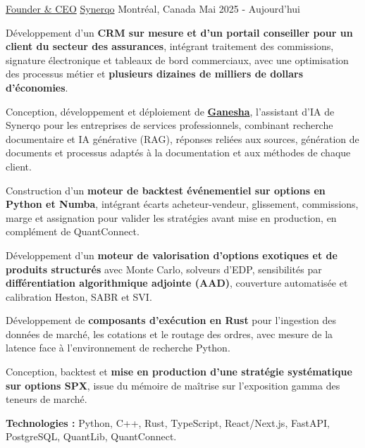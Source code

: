 \begin{cventries}

  \cventry
    {\href{https://synerqo.com/fr}{Founder \& CEO}}
    {\href{https://synerqo.com/fr}{Synerqo}}
    {Montréal, Canada}
    {Mai 2025 - Aujourd'hui}
    {
      \begin{cvitems}
        \item{Développement d'un \textbf{CRM sur mesure et d'un portail conseiller pour un client du secteur des assurances}, intégrant traitement des commissions, signature électronique et tableaux de bord commerciaux, avec une optimisation des processus métier et \textbf{plusieurs dizaines de milliers de dollars d'économies}.}
        \item{Conception, développement et déploiement de \textbf{\href{https://ganesha.synerqo.com/fr}{Ganesha}}, l'assistant d'IA de Synerqo pour les entreprises de services professionnels, combinant recherche documentaire et IA générative (RAG), réponses reliées aux sources, génération de documents et processus adaptés à la documentation et aux méthodes de chaque client.}
        \item{Construction d'un \textbf{moteur de backtest événementiel sur options en Python et Numba}, intégrant écarts acheteur-vendeur, glissement, commissions, marge et assignation pour valider les stratégies avant mise en production, en complément de QuantConnect.}
        \item{Développement d'un \textbf{moteur de valorisation d'options exotiques et de produits structurés} avec Monte Carlo, solveurs d'EDP, sensibilités par \textbf{différentiation algorithmique adjointe (AAD)}, couverture automatisée et calibration Heston, SABR et SVI.}
        \item{Développement de \textbf{composants d'exécution en Rust} pour l'ingestion des données de marché, les cotations et le routage des ordres, avec mesure de la latence face à l'environnement de recherche Python.}
        \item{Conception, backtest et \textbf{mise en production d'une stratégie systématique sur options SPX}, issue du mémoire de maîtrise sur l'exposition gamma des teneurs de marché.}
        \item{\textbf{Technologies :} Python, C++, Rust, TypeScript, React/Next.js, FastAPI, PostgreSQL, QuantLib, QuantConnect.}
      \end{cvitems}
    }


\end{cventries}
